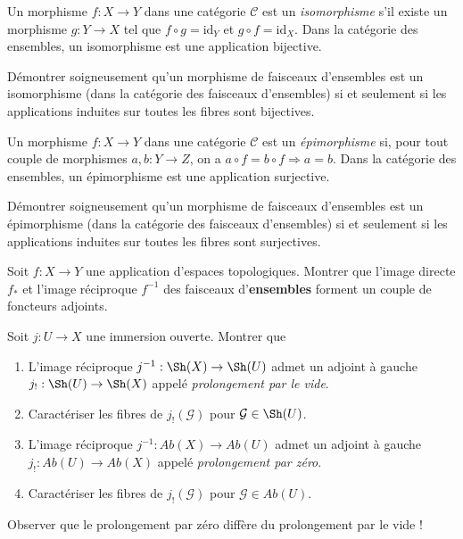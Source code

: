 \noindent
Un morphisme $f : X \to Y$ dans une catégorie $\mathcal{C}$ est un {\it isomorphisme}
s'il existe un morphisme $g : Y \to X$ tel que $f \circ g = \text{id}_Y$
et $g \circ f = \text{id}_X$. Dans la catégorie des ensembles,
un isomorphisme est une application bijective.

\begin{exercise}
\label{exercise-isomorphism-sheaves-sets}
Démontrer soigneusement qu'un morphisme de faisceaux d'ensembles est un isomorphisme
(dans la catégorie des faisceaux d'ensembles) si et seulement si les applications induites
sur toutes les fibres sont bijectives.
\end{exercise}

\noindent
Un morphisme $f : X \to Y$ dans une catégorie $\mathcal{C}$ est un {\it épimorphisme}
si, pour tout couple de morphismes $a, b : Y \to Z$, on a
$a \circ f = b \circ f \Rightarrow a = b$. Dans la
catégorie des ensembles, un épimorphisme est une application surjective.

\begin{exercise}
\label{exercise-epi-sheaves-sets}
Démontrer soigneusement qu'un morphisme de faisceaux d'ensembles est un épimorphisme
(dans la catégorie des faisceaux d'ensembles) si et seulement si les applications induites
sur toutes les fibres sont surjectives.
\end{exercise}

\begin{exercise}
\label{exercise-adjoint-push-pull}
Soit $f : X \to Y$ une application d'espaces topologiques.
Montrer que l'image directe $f_\ast$ et l'image réciproque $f^{-1}$ des faisceaux d'{\bf ensembles}
forment un couple de foncteurs adjoints.
\end{exercise}

\begin{exercise}
\label{exercise-j-shriek}
Soit $j : U \to X$ une immersion ouverte. Montrer que
\begin{enumerate}
\item L'image réciproque $j^{-1} : \Sh(X) \to \Sh(U)$ admet un adjoint à gauche
$j_{!} : \Sh(U) \to \Sh(X)$ appelé {\it prolongement par le vide}.
\item Caractériser les fibres de $j_{!}({\mathcal G})$ pour
$\mathcal{G} \in \Sh(U)$.
\item L'image réciproque $j^{-1} : \textit{Ab}(X) \to \textit{Ab}(U)$ admet un adjoint à gauche
$j_{!} : \textit{Ab}(U) \to \textit{Ab}(X)$ appelé {\it prolongement par zéro}.
\item Caractériser les fibres de $j_{!}({\mathcal G})$ pour
$\mathcal{G} \in \textit{Ab}(U)$.
\end{enumerate}
Observer que le prolongement par zéro diffère du prolongement par le
vide !
\end{exercise}

